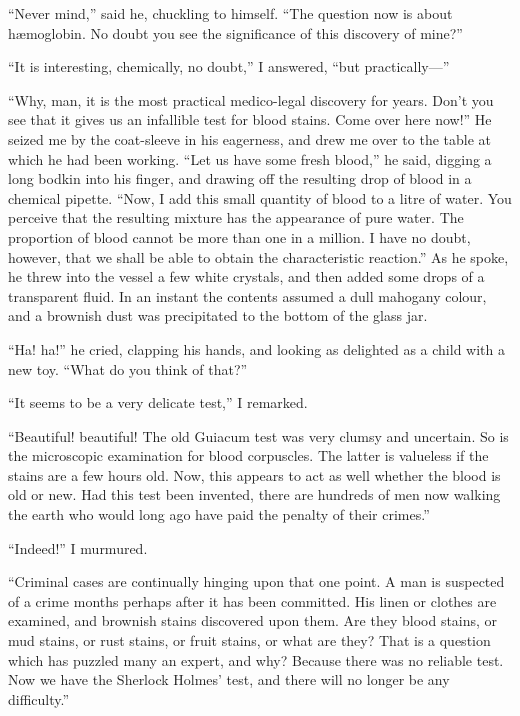 \documentclass[12pt,english,oneside]{book}
\newcommand{\mdsh}[1]{\mbox{#1}\linebreak[1]}
\begin{document}
{}``Never mind,'' said he, chuckling to himself. {}``The question
now is about h\ae moglobin. No doubt you see the significance of
this discovery of mine?''

{}``It is interesting, chemically, no doubt,'' I answered, {}``but
practically\mdsh{---}''

{}``Why, man, it is the most practical medico-legal discovery for
years. Don't you see that it gives us an infallible test for blood
stains. Come over here now!'' He seized me by the coat-sleeve in
his eagerness, and drew me over to the table at which he had been
working. {}``Let us have some fresh blood,'' he said, digging a
long bodkin into his finger, and drawing off the resulting drop of
blood in a chemical pipette. {}``Now, I add this small quantity of
blood to a litre of water. You perceive that the resulting mixture
has the appearance of pure water. The proportion of blood cannot be
more than one in a million. I have no doubt, however, that we shall
be able to obtain the characteristic reaction.'' As he spoke, he
threw into the vessel a few white crystals, and then added some drops
of a transparent fluid. In an instant the contents assumed a dull
mahogany colour, and a brownish dust was precipitated to the bottom
of the glass jar.

{}``Ha! ha!'' he cried, clapping his hands, and looking as delighted
as a child with a new toy. {}``What do you think of that?''

{}``It seems to be a very delicate test,'' I remarked.

{}``Beautiful! beautiful! The old Guiacum test was very clumsy and
uncertain. So is the microscopic examination for blood corpuscles.
The latter is valueless if the stains are a few hours old. Now, this
appears to act as well whether the blood is old or new. Had this test
been invented, there are hundreds of men now walking the earth who
would long ago have paid the penalty of their crimes.''

{}``Indeed!'' I murmured.

{}``Criminal cases are continually hinging upon that one point. A
man is suspected of a crime months perhaps after it has been committed.
His linen or clothes are examined, and brownish stains discovered
upon them. Are they blood stains, or mud stains, or rust stains, or
fruit stains, or what are they? That is a question which has puzzled
many an expert, and why? Because there was no reliable test. Now we
have the Sherlock Holmes' test, and there will no longer be any difficulty.''
\end{document}
